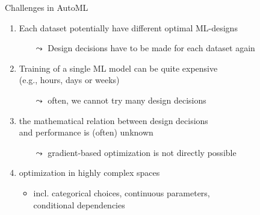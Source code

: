 \begin{frame}[c]{Challenges in AutoML}

\begin{enumerate}
  \item Each dataset potentially have \alert{different optimal ML-designs}
  \begin{itemize}
    \item[$\leadsto$] Design decisions have to be made for each dataset again
  \end{itemize}
  \smallskip
  \pause
  \item Training of a single ML model can be quite \alert{expensive}\\
  		(e.g., hours, days or weeks)
  \begin{itemize}
    \item[$\leadsto$] often, we cannot try many design decisions
  \end{itemize}
  \smallskip
  \pause
  \item the \alert{mathematical relation} between design decisions\\ and performance is (often) \alert{unknown}
  \begin{itemize}
    \item[$\leadsto$] gradient-based optimization is not directly possible
  \end{itemize}
  \smallskip
  \pause
  \item optimization in \alert{highly complex spaces}
  \begin{itemize}
    \item incl. categorical choices, continuous parameters,\\ conditional dependencies
  \end{itemize}
  
\end{enumerate}

\end{frame}



